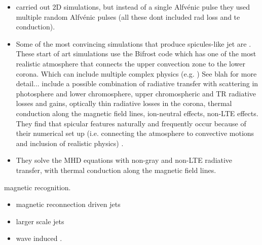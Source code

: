 \documentclass[12pt]{ociamthesis}
\newcommand{\Alfvenic}{Alfv\'{e}nic }
\begin{document}
\begin{itemize}
\item \cite{Kudoh1999ApJ514493K} carried out 2D simulations, but instead of a single \Alfvenic pulse they used multiple random \Alfvenic pulses (all these dont included rad loss and te conduction).  
\item Some of the most convincing simulations that produce spicules-like jet are \citep{Mart2017Sci3561269M,Mart2018ApJ860116M,Mart2020ApJ88995M}. These start of art simulations use the Bifrost code \citep{Gudiksen2011AA531A154G} which has one of the most realistic atmosphere that connects the upper convection zone to the lower corona. Which can include multiple complex physics (e.g. ) See blah for more detail... include a possible combination of radiative transfer with scattering in photosphere and lower chromosphere, upper chromospheric and TR radiative losses and gains, optically thin radiative losses in the corona, thermal conduction along the magnetic field lines, ion-neutral effects, non-LTE effects. They find that spicular features naturally and frequently occur because of their numerical set up (i.e. connecting the atmosphere to convective motions and inclusion of realistic physics) \cite{Mart2017Sci3561269M}. 
\item They solve the MHD equations with non-gray and non-LTE radiative transfer, with thermal conduction along the magnetic field lines. 
\end{itemize}
magnetic recognition.
\begin{itemize}
\item magnetic reconnection driven jets \cite{Gonz2018arXiv180704224G,Gonz2018ApJ856176G,Gonz2017ApJ,Isobe2008ApJ679L57I,Archontis2005ApJ6351299A} 
\item larger scale jets \cite{Yokoyama1995Natur37542Y,Yokoyama1996PASJ48353Y,Nishizuka2008ApJ683L83N}
\item wave induced \cite{Heggland2009ApJ7021H}.
\end{itemize}
\end{document}
